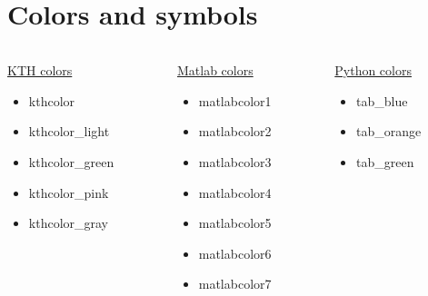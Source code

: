 \documentclass[aspectratio=1610,11pt]{beamer}
\begin{document}
\section{Colors and symbols}
\begin{frame}{\insertsection}
    \begin{columns}[t]
        \begin{column}{0.33\textwidth}
            \underline{KTH colors}
            \begin{itemize}
                \item \textcolor{kthcolor}{kthcolor}
                \item \textcolor{kthcolor_light}{kthcolor\_light}
                \item \textcolor{kthcolor_green}{kthcolor\_green}
                \item \textcolor{kthcolor_pink}{kthcolor\_pink}
                \item \textcolor{kthcolor_gray}{kthcolor\_gray}
            \end{itemize}
        \end{column}
        \begin{column}{0.33\textwidth}
            \underline{Matlab colors}
            \begin{itemize}
                \item \textcolor{matlabcolor1}{matlabcolor1}
                \item \textcolor{matlabcolor2}{matlabcolor2}
                \item \textcolor{matlabcolor3}{matlabcolor3}
                \item \textcolor{matlabcolor4}{matlabcolor4}
                \item \textcolor{matlabcolor5}{matlabcolor5}
                \item \textcolor{matlabcolor6}{matlabcolor6}
                \item \textcolor{matlabcolor7}{matlabcolor7}
            \end{itemize}
        \end{column}
        \begin{column}{0.33\textwidth}
            \underline{Python colors}
            \begin{itemize}
            \item \textcolor{tab_blue}{tab\_blue}
            \item \textcolor{tab_orange}{tab\_orange}
            \item \textcolor{tab_green}{tab\_green}

\end{itemize}
\end{column}
\end{columns}
\end{frame}
\end{document}
